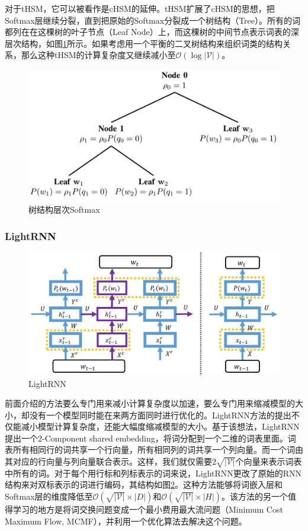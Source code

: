 \documentclass[12pt,a4paper]{article}
\begin{document}
对于tHSM，它可以被看作是cHSM的延伸。tHSM扩展了cHSM的思想，把Softmax层继续分裂，直到把原始的Softmax分裂成一个树结构（Tree）。所有的词都列在在这棵树的叶子节点（Leaf Node）上，而这棵树的中间节点表示词表的深层次结构，如图\ref{fig:thsm}所示。如果考虑用一个平衡的二叉树结构来组织词类的结构关系，那么这种tHSM的计算复杂度又继续减小至${\mathcal{O}(\log |\mathcal{V}|)}$。
\begin{figure}[h]
  \centering
  \includegraphics[width=0.65\columnwidth]{./figures/thsm.jpg}
  \caption{树结构层次Softmax}
  \label{fig:thsm}
\end{figure}

\subsubsection{LightRNN}
\begin{figure}
  \centering
  \includegraphics[width=0.65\columnwidth]{./figures/lightrnn.jpg}
  \caption{LightRNN}
  \label{fig:lightrnn}
\end{figure}
前面介绍的方法要么专门用来减小计算复杂度以加速，要么专门用来缩减模型的大小，却没有一个模型同时能在来两方面同时进行优化的。LightRNN方法的提出不仅能减小模型计算复杂度，还能大幅度缩减模型的大小\cite{DBLP:conf/nips/LiQYHL16}。基于该想法，LightRNN提出一个2-Component shared embedding，将词分配到一个二维的词表里面。词表所有相同行的词共享一个行向量，所有相同列的词共享一个列向量。而一个词由其对应的行向量与列向量联合表示。这样，我们就仅需要${2\sqrt{|\mathcal{V}|}}$个向量来表示词表中所有的词。对于每个用行标和列标表示的词来说，LightRNN更改了原始的RNN结构来对双标表示的词进行编码，其结构如图\ref{fig:lightrnn}。这种方法能够将词嵌入层和Softmax层的维度降低至${\mathcal{O}(\sqrt{|\mathcal{V}|} \times |D|)}$和${\mathcal{O}(\sqrt{|\mathcal{V}|} \times |H|)}$。该方法的另一个值得学习的地方是将词交换问题变成一个最小费用最大流问题（Minimum Cost Maximum Flow, MCMF），并利用一个优化算法\cite{Preis1999}去解决这个问题。
\end{document}

